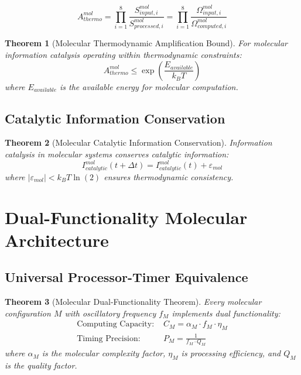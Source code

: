\documentclass[12pt,a4paper]{article}
\newtheorem{theorem}{Theorem}[section]
\begin{document}
\begin{equation}
A_{thermo}^{mol} = \prod_{i=1}^{8} \frac{S_{input,i}^{mol}}{S_{processed,i}^{mol}} = \prod_{i=1}^{8} \frac{\Omega_{input,i}^{mol}}{\Omega_{computed,i}^{mol}}
\end{equation}

\begin{theorem}[Molecular Thermodynamic Amplification Bound]
For molecular information catalysis operating within thermodynamic constraints:
\begin{equation}
A_{thermo}^{mol} \leq \exp\left(\frac{E_{available}}{k_B T}\right)
\end{equation}
where $E_{available}$ is the available energy for molecular computation.
\end{theorem}

\subsection{Catalytic Information Conservation}

\begin{theorem}[Molecular Catalytic Information Conservation]
Information catalysis in molecular systems conserves catalytic information:
\begin{equation}
I_{catalytic}^{mol}(t + \Delta t) = I_{catalytic}^{mol}(t) + \varepsilon_{mol}
\end{equation}
where $|\varepsilon_{mol}| < k_B T \ln(2)$ ensures thermodynamic consistency.
\end{theorem}

\section{Dual-Functionality Molecular Architecture}

\subsection{Universal Processor-Timer Equivalence}

\begin{theorem}[Molecular Dual-Functionality Theorem]
Every molecular configuration $M$ with oscillatory frequency $f_M$ implements dual functionality:
\begin{align}
\text{Computing Capacity: } &C_M = \alpha_M \cdot f_M \cdot \eta_M \\
\text{Timing Precision: } &P_M = \frac{1}{f_M \cdot Q_M}
\end{align}
where $\alpha_M$ is the molecular complexity factor, $\eta_M$ is processing efficiency, and $Q_M$ is the quality factor.
\end{theorem}
\end{document}
